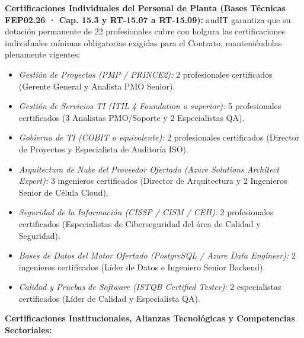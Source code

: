 \textbf{Certificaciones Individuales del Personal de Planta (Bases Técnicas FEP02.26 · Cap. 15.3 y RT-15.07 a RT-15.09):}
audIT garantiza que su dotación permanente de 22 profesionales cubre con holgura las certificaciones individuales mínimas obligatorias exigidas para el Contrato, manteniéndolas plenamente vigentes:
\begin{itemize}
    \item \emph{Gestión de Proyectos (PMP / PRINCE2):} 2 profesionales certificados (Gerente General y Analista PMO Senior).
    \item \emph{Gestión de Servicios TI (ITIL 4 Foundation o superior):} 5 profesionales certificados (3 Analistas PMO/Soporte y 2 Especialistas QA).
    \item \emph{Gobierno de TI (COBIT o equivalente):} 2 profesionales certificados (Director de Proyectos y Especialista de Auditoría ISO).
    \item \emph{Arquitectura de Nube del Proveedor Ofertado (Azure Solutions Architect Expert):} 3 ingenieros certificados (Director de Arquitectura y 2 Ingenieros Senior de Célula Cloud).
    \item \emph{Seguridad de la Información (CISSP / CISM / CEH):} 2 profesionales certificados (Especialistas de Ciberseguridad del área de Calidad y Seguridad).
    \item \emph{Bases de Datos del Motor Ofertado (PostgreSQL / Azure Data Engineer):} 2 ingenieros certificados (Líder de Datos e Ingeniero Senior Backend).
    \item \emph{Calidad y Pruebas de Software (ISTQB Certified Tester):} 2 especialistas certificados (Líder de Calidad y Especialista QA).
\end{itemize}

\textbf{Certificaciones Institucionales, Alianzas Tecnológicas y Competencias Sectoriales:}


